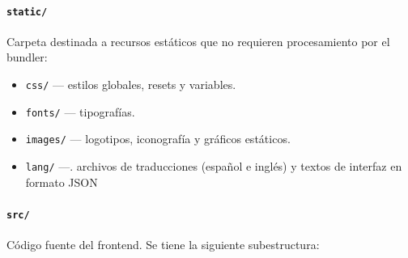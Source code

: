 \documentclass[12pt, a4paper]{article}
\begin{document}
\paragraph{\texttt{static/}}  
Carpeta destinada a recursos estáticos que no requieren procesamiento por el bundler:
\begin{itemize}
	\item \texttt{css/} — estilos globales, resets y variables.
	\item \texttt{fonts/} — tipografías.
	\item \texttt{images/} — logotipos, iconografía y gráficos estáticos.
	\item \texttt{lang/} —. archivos de traducciones (español e inglés) y textos de interfaz en formato JSON
\end{itemize}


\paragraph{\texttt{src/}} Código fuente del frontend. Se tiene la siguiente subestructura:
\end{document}
